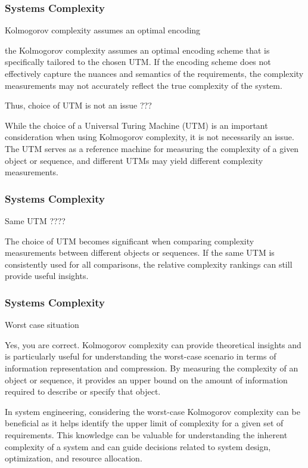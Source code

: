 \newpage
\begin{frame}
\frametitle{Systems Complexity }
\begin{block}{Kolmogorov complexity assumes an optimal encoding  }


the Kolmogorov complexity assumes an optimal encoding scheme that is specifically tailored to the chosen UTM. If the encoding scheme does not effectively capture the nuances and semantics of the requirements, the complexity measurements may not accurately reflect the true complexity of the system.

Thus, choice of UTM is not an issue ???

While the choice of a Universal Turing Machine (UTM) is an important consideration when using Kolmogorov complexity, it is not necessarily an issue. The UTM serves as a reference machine for measuring the complexity of a given object or sequence, and different UTMs may yield different complexity measurements.


\end{block}
\end{frame}


\newpage
\begin{frame}
\frametitle{Systems Complexity }
\begin{block}{Same UTM ???? }


The choice of UTM becomes significant when comparing complexity measurements between different objects or sequences. If the same UTM is consistently used for all comparisons, the relative complexity rankings can still provide useful insights.


\end{block}
\end{frame}




\newpage
\begin{frame}
\frametitle{Systems Complexity }
\begin{block}{ Worst case situation }


Yes, you are correct. Kolmogorov complexity can provide theoretical insights and is particularly useful for understanding the worst-case scenario in terms of information representation and compression. By measuring the complexity of an object or sequence, it provides an upper bound on the amount of information required to describe or specify that object.


In system engineering, considering the worst-case Kolmogorov complexity can be beneficial as it helps identify the upper limit of complexity for a given set of requirements. This knowledge can be valuable for understanding the inherent complexity of a system and can guide decisions related to system design, optimization, and resource allocation.

\end{block}
\end{frame}


